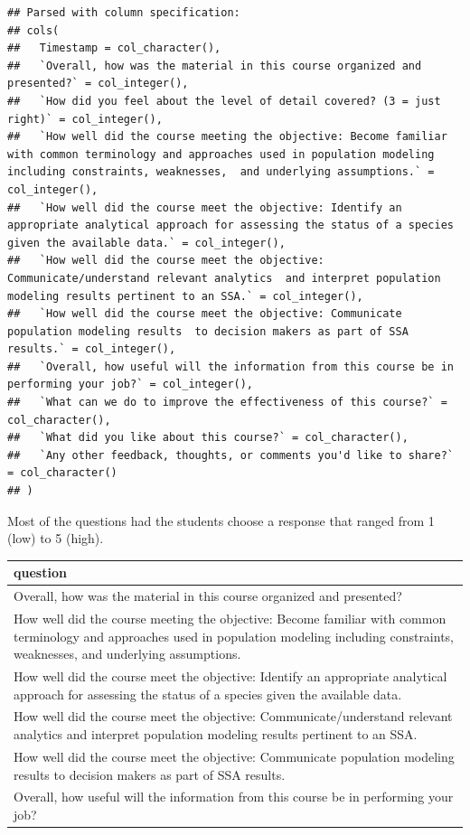 \documentclass[]{article}
\begin{document}
\begin{verbatim}
## Parsed with column specification:
## cols(
##   Timestamp = col_character(),
##   `Overall, how was the material in this course organized and presented?` = col_integer(),
##   `How did you feel about the level of detail covered? (3 = just right)` = col_integer(),
##   `How well did the course meeting the objective: Become familiar with common terminology and approaches used in population modeling  including constraints, weaknesses,  and underlying assumptions.` = col_integer(),
##   `How well did the course meet the objective: Identify an appropriate analytical approach for assessing the status of a species given the available data.` = col_integer(),
##   `How well did the course meet the objective: Communicate/understand relevant analytics  and interpret population modeling results pertinent to an SSA.` = col_integer(),
##   `How well did the course meet the objective: Communicate population modeling results  to decision makers as part of SSA results.` = col_integer(),
##   `Overall, how useful will the information from this course be in performing your job?` = col_integer(),
##   `What can we do to improve the effectiveness of this course?` = col_character(),
##   `What did you like about this course?` = col_character(),
##   `Any other feedback, thoughts, or comments you'd like to share?` = col_character()
## )
\end{verbatim}

Most of the questions had the students choose a response that ranged
from 1 (low) to 5 (high).

\begin{table}[H]
\centering
\begin{tabular}{l}
\hline
question\\
\hline
Overall, how was the material in this course organized and presented?\\
\hline
How well did the course meeting the objective: Become familiar with common terminology and approaches used in population modeling  including constraints, weaknesses,  and underlying assumptions.\\
\hline
How well did the course meet the objective: Identify an appropriate analytical approach for assessing the status of a species given the available data.\\
\hline
How well did the course meet the objective: Communicate/understand relevant analytics  and interpret population modeling results pertinent to an SSA.\\
\hline
How well did the course meet the objective: Communicate population modeling results  to decision makers as part of SSA results.\\
\hline
Overall, how useful will the information from this course be in performing your job?\\
\hline
\end{tabular}
\end{table}
\end{document}
